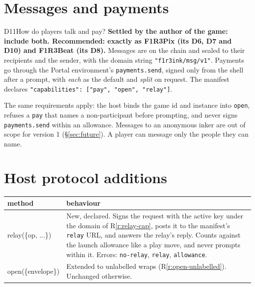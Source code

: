\documentclass[11pt,a4paper]{article}
\newcommand{\code}[1]{\texttt{#1}}
\newcounter{req}
\begin{document}
\section{Messages and payments}\label{sec:mail}

\begin{decision}{D11}{How do players talk and pay?}
\textbf{Settled by the author of the game: include both. Recommended: exactly as F1R3Pix (its
D6, D7 and D10) and F1R3Beat (its D8).} Messages are on the chain and sealed to their recipients
and the sender, with the domain string \code{"f1r3ink/msg/v1"}. Payments go through the Portal
environment's \code{payments.send}, signed only from the shell after a prompt, with \emph{each}
as the default and \emph{split} on request. The manifest declares
\code{"capabilities": ["pay", "open", "relay"]}.
\end{decision}

The same requirements apply: the host binds the game id and instance into \code{open}, refuses a
\code{pay} that names a non-participant before prompting, and never signs \code{payments.send}
within an allowance. Messages to an anonymous inker are out of scope for version 1
(\S\ref{sec:future}). A player can message only the people they can name.

\section{Host protocol additions}\label{sec:host}

\begin{center}\small
\begin{tabularx}{\linewidth}{@{}>{\ttfamily}l X@{}}
\toprule
\normalfont method & behaviour\\
\midrule
relay(\{op, ...\}) & New, declared. Signs the request with the active key under the domain of R\ref{r:relay-cap}, posts it to the manifest's \code{relay} URL, and answers the relay's reply. Counts against the launch allowance like a play move, and never prompts within it. Errors: \code{no-relay}, \code{relay}, \code{allowance}.\\
open(\{envelope\}) & Extended to unlabelled wraps (R\ref{r:open-unlabelled}). Unchanged otherwise.\\
\bottomrule
\end{tabularx}
\end{center}
\end{document}
